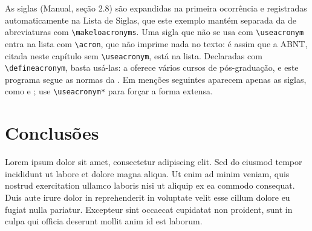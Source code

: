 \documentclass[dsc,pdfa,setavermelha]{ufrj}
\theoremstyle{plain}
\theoremstyle{definition}
\theoremstyle{remark}
\begin{document}

  As siglas (Manual, seção 2.8) são expandidas na primeira ocorrência e registradas automaticamente na Lista de Siglas, que este exemplo mantém separada da de abreviaturas com \verb|\makeloacronyms|. Uma sigla que não se usa com \verb|\useacronym| entra na lista com \verb|\acron|, que não imprime nada no texto: é assim que a ABNT, citada neste capítulo sem \verb|\useacronym|, está na lista. Declaradas com \verb|\defineacronym|, basta usá-las: a  oferece vários cursos de pós-graduação, e este programa segue as normas da . Em menções seguintes aparecem apenas as siglas, como  e ; use \verb|\useacronym*| para forçar a forma extensa.

  \chapter{Conclusões}

  Lorem ipsum dolor sit amet, consectetur adipiscing elit. Sed do eiusmod tempor incididunt ut labore et dolore magna aliqua. Ut enim ad minim veniam, quis nostrud exercitation ullamco laboris nisi ut aliquip ex ea commodo consequat. Duis aute irure dolor in reprehenderit in voluptate velit esse cillum dolore eu fugiat nulla pariatur. Excepteur sint occaecat cupidatat non proident, sunt in culpa qui officia deserunt mollit anim id est laborum.

  \backmatter

  \nocite{patente-example,legislacao-example,norma-example,mapa-example,partitura-example}
  \nocite{jurisprudencia-example}
  \nocite{videogame-example,filme-example,semautor-example,semautorart-example}
  \nocite{jornalcaderno-example,jornal-example}
  \printbibliography

  \printglossarylist

\appendix
\end{document}
